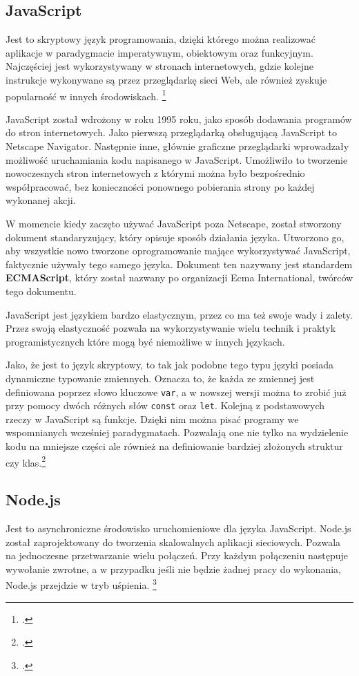 \subsection{JavaScript}
Jest to skryptowy język programowania, dzięki którego można realizować aplikacje w paradygmacie imperatywnym, obiektowym oraz funkcyjnym. Najczęściej jest wykorzystywany w stronach internetowych, gdzie kolejne instrukcje wykonywane są przez przeglądarkę sieci Web, ale również zyskuje popularność w innych środowiskach. \footcite{aboutJS}
\par JavaScript został wdrożony w roku 1995 roku, jako sposób dodawania programów do stron internetowych. Jako pierwszą przeglądarką obsługującą JavaScript to Netscape Navigator. Następnie inne, głównie graficzne przeglądarki wprowadzały możliwość uruchamiania kodu napisanego w JavaScript. Umożliwiło to tworzenie nowoczesnych stron internetowych z którymi można było bezpośrednio współpracować, bez konieczności ponownego pobierania strony po każdej wykonanej akcji.
\par W momencie kiedy zaczęto używać JavaScript poza Netscape, został stworzony dokument standaryzujący, który opisuje sposób działania języka. Utworzono go, aby wszystkie nowo tworzone oprogramowanie mające wykorzystywać JavaScript, faktycznie używały tego samego języka. Dokument ten nazywany jest standardem \textbf{ECMAScript}, który został nazwany po organizacji Ecma International, twórców tego dokumentu.
\par JavaScript jest językiem bardzo elastycznym, przez co ma też swoje wady i zalety. Przez swoją elastyczność pozwala na wykorzystywanie wielu technik i praktyk programistycznych które mogą być niemożliwe w innych językach.
\par Jako, że jest to język skryptowy, to tak jak podobne tego typu języki posiada dynamiczne typowanie zmiennych. Oznacza to, że każda ze zmiennej jest definiowana poprzez słowo kluczowe \texttt{var}, a w nowszej wersji można to zrobić już przy pomocy dwóch różnych słów \texttt{const} oraz \texttt{let}. Kolejną z podstawowych rzeczy w JavaScript są funkcje. Dzięki nim można pisać programy we wspomnianych wcześniej paradygmatach. Pozwalają one nie tylko na wydzielenie kodu na mniejsze części ale również na definiowanie bardziej złożonych struktur czy klas.\footcite{EloquentJavaScript}

\subsection{Node.js}
Jest to asynchroniczne środowisko uruchomieniowe dla języka JavaScript. Node.js został zaprojektowany do tworzenia skalowalnych aplikacji sieciowych. Pozwala na jednoczesne przetwarzanie wielu połączeń. Przy każdym połączeniu następuje wywołanie zwrotne, a w przypadku jeśli nie będzie żadnej pracy do wykonania, Node.js przejdzie w tryb uśpienia.
\footcite{Node.js2017}

